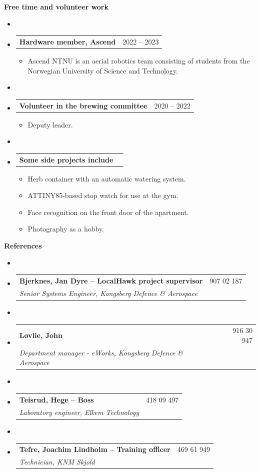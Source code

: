 \documentclass[letterpaper,12pt]{article}[leftmargin=*]
\makeatletter
\def \entryspacing {-0pt}
\renewcommand{\section}[2]{\vspace{5pt}
  \colorbox{secondary}{\color{white}\raggedbottom\normalsize\textbf{{#1}{\hspace{7pt}#2}}}
}
\newcommand{\resumeEntryStart}{\begin{itemize}[leftmargin=2.5mm]\item[]}
\newcommand{\resumeEntryEnd}{\end{itemize}\vspace{\entryspacing}}
\newcommand{\resumeItemListStart}{\begin{itemize}[leftmargin=4.5mm]}
\newcommand{\resumeItemListEnd}{\end{itemize}}
\newcommand{\resumeItem}[1]{
  \item\small{
    {#1 \vspace{-2pt}}
  }
}
\newcommand{\resumeEntryTSDL}[4]{
  \vspace{-1pt}\item[]
    \begin{tabularx}{0.97\textwidth}{X@{\hspace{60pt}}r}
      \textbf{\color{primary}#1} & {\firabook\color{accent}\small#2} \\
      \textit{\color{accent}\small#3} & \textit{\color{accent}\small#4} \\
    \end{tabularx}\vspace{-6pt}
}
\newcommand{\resumeEntryTD}[2]{
  \vspace{-1pt}\item[]
    \begin{tabularx}{0.97\textwidth}{X@{\hspace{60pt}}r}
      \textbf{\color{primary}#1} & {\firabook\color{accent}\small#2} \\
    \end{tabularx}\vspace{-6pt}
}
\makeatother
\begin{document}
\section{\faPuzzlePiece}{Free time and volunteer work}
\vspace{-15pt}
  \resumeEntryStart
    \resumeEntryTD
      {Hardware member, Ascend}{2022 -- 2023}
    \resumeItemListStart
      \resumeItem {Ascend NTNU is an aerial robotics team consisting of students from the Norwegian University of Science and Technology.}
    \resumeItemListEnd
  \resumeEntryEnd
  \vspace{-1cm}
  \resumeEntryStart
    \resumeEntryTD
      {Volunteer in the brewing committee}{2020 -- 2022}
      \resumeItemListStart
        \resumeItem{Deputy leader.}
      \resumeItemListEnd
  \resumeEntryEnd
  \vspace{-1cm}
  \resumeEntryStart
    \resumeEntryTD
      {Some side projects include}{}
    \resumeItemListStart
      \resumeItem{Herb container with an automatic watering system.}
      \resumeItem{ATTINY85-based stop watch for use at the gym.}
      \resumeItem{Face recognition on the front door of the apartment.}
      \resumeItem{Photography as a hobby.}
    \resumeItemListEnd
  \resumeEntryEnd

  \section{\faUsers}{References}
  \vspace{-15pt}
  \resumeEntryStart
      \resumeEntryTSDL
        {Bjerknes, Jan Dyre -- \normalfont LocalHawk project supervisor}{907 02 187}
        {Senior Systems Engineer, Kongsberg Defence \& Aerospace}{}
  \resumeEntryEnd
  \resumeEntryStart
      \resumeEntryTSDL
        {Løvlie, John} {916 30 947}
        {Department manager - eWorks, Kongsberg Defence \& Aerospace}{}
  \resumeEntryEnd

  \resumeEntryStart
      \resumeEntryTSDL
        {Teisrud, Hege -- \normalfont Boss}{418 09 497}
        {Laboratory engineer, Elkem Technology}{}
  \resumeEntryEnd
  \resumeEntryStart
      \resumeEntryTSDL
        {Tefre, Joachim Lindholm -- \normalfont Training officer}{469 61 949}
        {Technician, KNM Skjold}{}
  \resumeEntryEnd
\end{document}
